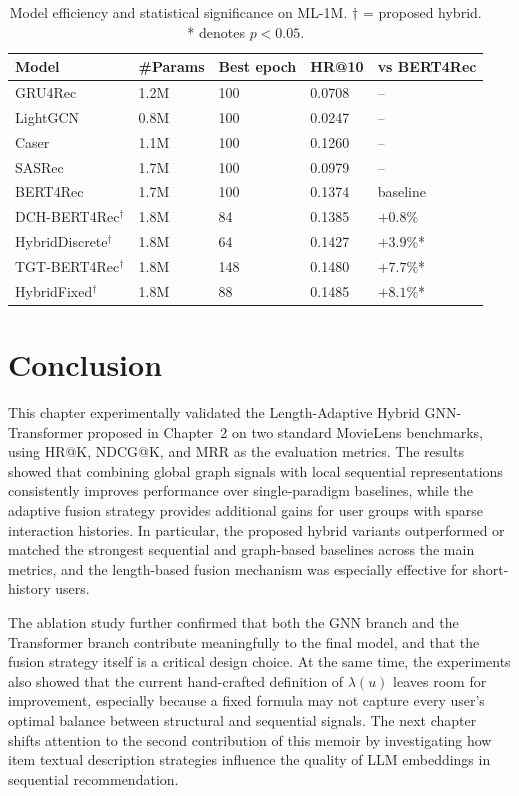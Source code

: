 \documentclass[12pt,a4paper]{report}
\begin{document}
\begin{table}[h]
\centering
\caption{Model efficiency and statistical significance on ML-1M.
\(\dagger\) = proposed hybrid. * denotes \(p < 0.05\).}
\label{tab:efficiency}
\begin{tabular}{p{3.8cm} p{2cm} p{2cm} p{2.5cm} p{2.5cm}}
\toprule
\textbf{Model} & \textbf{\#Params} & \textbf{Best epoch} &
\textbf{HR@10} & \textbf{vs BERT4Rec} \\
\midrule
GRU4Rec              & 1.2M & 100 & 0.0708 & -- \\
LightGCN             & 0.8M & 100 & 0.0247 & -- \\
Caser                & 1.1M & 100 & 0.1260 & -- \\
SASRec               & 1.7M & 100 & 0.0979 & -- \\
BERT4Rec             & 1.7M & 100 & 0.1374 & baseline \\
DCH-BERT4Rec\(^\dagger\)   & 1.8M & 84  & 0.1385 & \(+0.8\%\) \\
HybridDiscrete\(^\dagger\) & 1.8M & 64  & 0.1427 & \(+3.9\%\)*  \\
TGT-BERT4Rec\(^\dagger\)   & 1.8M & 148 & 0.1480 & \(+7.7\%\)*  \\
HybridFixed\(^\dagger\)    & 1.8M & 88  & 0.1485 & \(+8.1\%\)*  \\
\bottomrule
\end{tabular}
\end{table}

\section{Conclusion}
\label{sec:ch3conclusion}

This chapter experimentally validated the Length-Adaptive Hybrid GNN-Transformer
proposed in Chapter~2 on two standard MovieLens benchmarks, using HR@K,
NDCG@K, and MRR as the evaluation metrics. The results showed that combining
global graph signals with local sequential representations consistently improves
performance over single-paradigm baselines, while the adaptive fusion strategy
provides additional gains for user groups with sparse interaction histories.
In particular, the proposed hybrid variants outperformed or matched the
strongest sequential and graph-based baselines across the main metrics, and the
length-based fusion mechanism was especially effective for short-history users.

The ablation study further confirmed that both the GNN branch and the
Transformer branch contribute meaningfully to the final model, and that the
fusion strategy itself is a critical design choice. At the same time, the
experiments also showed that the current hand-crafted definition of
\(\lambda(u)\) leaves room for improvement, especially because a fixed formula
may not capture every user's optimal balance between structural and sequential
signals. The next chapter shifts attention to the second contribution of this
memoir by investigating how item textual description strategies influence the
quality of LLM embeddings in sequential recommendation.

\newpage
\printbibliography[heading=bibintoc, title={References}]
\end{document}
